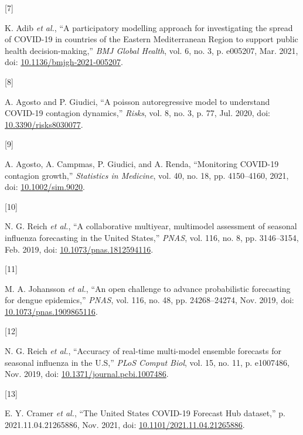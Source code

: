 \documentclass[
]{article}
\newlength{\cslhangindent}
\newlength{\csllabelwidth}
\newlength{\cslentryspacingunit} %
\newenvironment{CSLReferences}[2] %
 {%
  \setlength{\parindent}{0pt}
  \ifodd #1
  \let\oldpar\par
  \def\par{\hangindent=\cslhangindent\oldpar}
  \fi
  \setlength{\parskip}{#2\cslentryspacingunit}
 }%
 {}
\newcommand{\CSLLeftMargin}[1]{\parbox[t]{\csllabelwidth}{#1}}
\newcommand{\CSLRightInline}[1]{\parbox[t]{\linewidth - \csllabelwidth}{#1}\break}
\begin{document}
\begin{CSLReferences}{0}{0}
\leavevmode{}%
\CSLLeftMargin{{[}7{]} }
\CSLRightInline{K. Adib \emph{et al.}, {``A participatory modelling approach for investigating the spread of {COVID-19} in countries of the {Eastern Mediterranean Region} to support public health decision-making,''} \emph{BMJ Global Health}, vol. 6, no. 3, p. e005207, Mar. 2021, doi: \href{https://doi.org/10.1136/bmjgh-2021-005207}{10.1136/bmjgh-2021-005207}.}

\leavevmode{}%
\CSLLeftMargin{{[}8{]} }
\CSLRightInline{A. Agosto and P. Giudici, {``A poisson autoregressive model to understand COVID-19 contagion dynamics,''} \emph{Risks}, vol. 8, no. 3, p. 77, Jul. 2020, doi: \href{https://doi.org/10.3390/risks8030077}{10.3390/risks8030077}.}

\leavevmode{}%
\CSLLeftMargin{{[}9{]} }
\CSLRightInline{A. Agosto, A. Campmas, P. Giudici, and A. Renda, {``Monitoring {COVID-19} contagion growth,''} \emph{Statistics in Medicine}, vol. 40, no. 18, pp. 4150--4160, 2021, doi: \href{https://doi.org/10.1002/sim.9020}{10.1002/sim.9020}.}

\leavevmode{}%
\CSLLeftMargin{{[}10{]} }
\CSLRightInline{N. G. Reich \emph{et al.}, {``A collaborative multiyear, multimodel assessment of seasonal influenza forecasting in the {United States},''} \emph{PNAS}, vol. 116, no. 8, pp. 3146--3154, Feb. 2019, doi: \href{https://doi.org/10.1073/pnas.1812594116}{10.1073/pnas.1812594116}.}

\leavevmode{}%
\CSLLeftMargin{{[}11{]} }
\CSLRightInline{M. A. Johansson \emph{et al.}, {``An open challenge to advance probabilistic forecasting for dengue epidemics,''} \emph{PNAS}, vol. 116, no. 48, pp. 24268--24274, Nov. 2019, doi: \href{https://doi.org/10.1073/pnas.1909865116}{10.1073/pnas.1909865116}.}

\leavevmode{}%
\CSLLeftMargin{{[}12{]} }
\CSLRightInline{N. G. Reich \emph{et al.}, {``Accuracy of real-time multi-model ensemble forecasts for seasonal influenza in the {U}.{S},''} \emph{PLoS Comput Biol}, vol. 15, no. 11, p. e1007486, Nov. 2019, doi: \href{https://doi.org/10.1371/journal.pcbi.1007486}{10.1371/journal.pcbi.1007486}.}

\leavevmode{}%
\CSLLeftMargin{{[}13{]} }
\CSLRightInline{E. Y. Cramer \emph{et al.}, {``The {United States COVID-19 Forecast Hub} dataset,''} p. 2021.11.04.21265886, Nov. 2021, doi: \href{https://doi.org/10.1101/2021.11.04.21265886}{10.1101/2021.11.04.21265886}.}


\end{CSLReferences}
\end{document}
